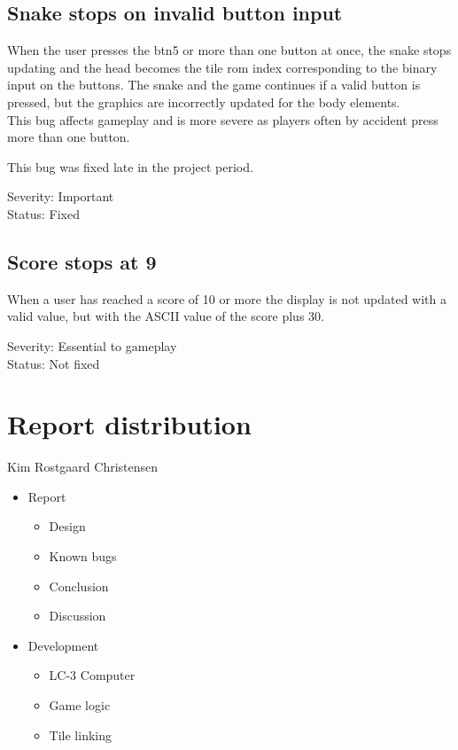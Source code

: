 \documentclass{acm_proc_article-sp}
\begin{document}
\subsection{Snake stops on invalid button input}
When the user presses the btn5 or more than one button at once, the snake stops updating and the head becomes the tile rom index corresponding to the binary input on the buttons. The snake and the game continues if a valid button is pressed, but the graphics are incorrectly updated for the body elements.\\
This bug affects gameplay and is more severe as players often by accident press more than one button.

This bug was fixed late in the project period.

Severity: Important\\
Status: Fixed

\subsection{Score stops at 9}
When a user has reached a score of 10 or more the display is not updated with a valid value, but with the ASCII value of the score plus 30.

Severity: Essential to gameplay\\
Status: Not fixed

\section{Report distribution}
Kim Rostgaard Christensen
\begin{itemize}
	\item Report
	\begin{itemize}
		\item Design
		\item Known bugs
		\item Conclusion
		\item Discussion
	\end{itemize}
	\item Development
	\begin{itemize}
		\item LC-3 Computer
		\item Game logic
		\item Tile linking
	\end{itemize}
\end{itemize}
\end{document}
